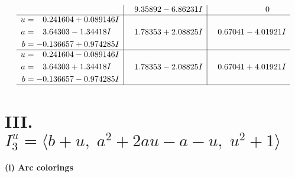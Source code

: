 \documentclass[1p]{elsarticle_modified}
\theoremstyle{definition}
\begin{document}
$$\begin{array}{c|c|c}
 & \phantom{-}9.35892 - 6.86231 I & \phantom{-0.000000 } 0 \\ \hline\begin{aligned}
u &= \phantom{-}0.241604 + 0.089146 I \\
a &= \phantom{-}3.64303 - 1.34418 I \\
b &= -0.136657 + 0.974285 I\end{aligned}
 & \phantom{-}1.78353 + 2.08825 I & \phantom{-}0.67041 - 4.01921 I \\ \hline\begin{aligned}
u &= \phantom{-}0.241604 - 0.089146 I \\
a &= \phantom{-}3.64303 + 1.34418 I \\
b &= -0.136657 - 0.974285 I\end{aligned}
 & \phantom{-}1.78353 - 2.08825 I & \phantom{-}0.67041 + 4.01921 I\\
 \hline 
 \end{array}$$\newpage\newpage\renewcommand{\arraystretch}{1}
\centering \section*{III. $I^u_{3}= \langle b+u,\;a^2+2 a u- a- u,\;u^2+1 \rangle$}
\flushleft \textbf{(i) Arc colorings}\\
\end{document}
